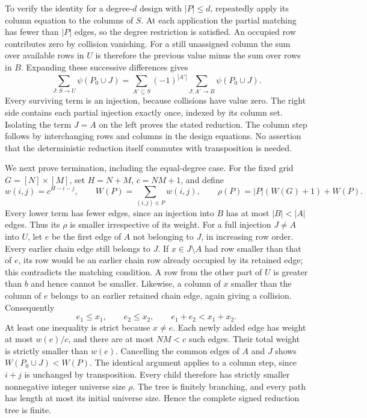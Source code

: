 \documentclass[11pt,a4paper,oneside,openany]{book}
\theoremstyle{definition}\newtheorem{definition}[theorem]{Definition}
\theoremstyle{remark}\newtheorem{remark}[theorem]{Remark}
\numberwithin{equation}{chapter}
\begin{document}
To verify the identity for a degree-$d$ design with $|P|\leq d$, repeatedly
apply its column equation to the columns of $S$.  At each application
the partial matching has fewer than $|P|$ edges, so the degree restriction
is satisfied.  An occupied row contributes zero by collision vanishing.
For a still unassigned column the sum over available rows in $U$ is
therefore the previous value minus the sum over rows in $B$.  Expanding
these successive differences gives
\[
 \sum_{J:S\to U}\psi(P_0\cup J)
  =\sum_{A'\subseteq S}(-1)^{|A'|}
       \sum_{J:A'\to B}\psi(P_0\cup J).
\]
Every surviving term is an injection, because collisions have value zero.
The right side contains each partial injection exactly once, indexed by
its column set.  Isolating the term $J=A$ on the left proves the stated
reduction.  The column step follows by interchanging rows and columns in
the design equations.  No assertion that the deterministic reduction
itself commutes with transposition is needed.

We next prove termination, including the equal-degree case.  For the
fixed grid $G=[N]\times[M]$, set $H=N+M$, $c=NM+1$, and define
\[
 w(i,j)=c^{H-i-j},\qquad W(P)=\sum_{(i,j)\in P}w(i,j),\qquad
 \rho(P)=|P|(W(G)+1)+W(P).
\]
Every lower term has fewer edges, since an injection into $B$ has at most
$|B|<|A|$ edges.  Thus its $\rho$ is smaller irrespective of its weight.
For a full injection $J\ne A$ into $U$, let $e$ be the first edge of $A$
not belonging to $J$, in increasing row order.  Every earlier chain edge
still belongs to $J$.  If $x\in J\setminus A$ had row smaller than that
of $e$, its row would be an earlier chain row already occupied by its
retained edge; this contradicts the matching condition.  A row from the
other part of $U$ is greater than $b$ and hence cannot be smaller.
Likewise, a column of $x$ smaller than the column of $e$ belongs to an
earlier retained chain edge, again giving a collision.  Consequently
\[
 e_1\leq x_1,\qquad e_2\leq x_2,\qquad e_1+e_2<x_1+x_2.
\]
At least one inequality is strict because $x\ne e$.  Each newly added
edge has weight at most $w(e)/c$, and there are at most $NM<c$ such
edges.  Their total weight is strictly smaller than $w(e)$.  Cancelling
the common edges of $A$ and $J$ shows $W(P_0\cup J)<W(P)$.
The identical argument applies to a column step, since $i+j$ is
unchanged by transposition.  Every child therefore has strictly smaller
nonnegative integer universe size $\rho$.  The tree is finitely branching, and
every path has length at most its initial universe size.  Hence the complete
signed reduction tree is finite.
\end{document}
